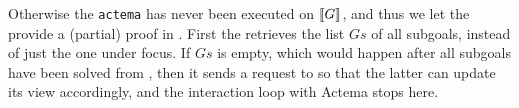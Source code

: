 Otherwise the \texttt{actema}  has never been executed on $\llbracket G \rrbracket$,
and thus we let the  provide a (partial) proof in . First
the  retrieves the list $Gs$ of all subgoals, instead of just
the one under focus. If $Gs$ is empty, which would happen after all subgoals
have been solved from , then it sends a  request to  so
that the latter can update its view accordingly, and the interaction loop with
Actema stops here.

